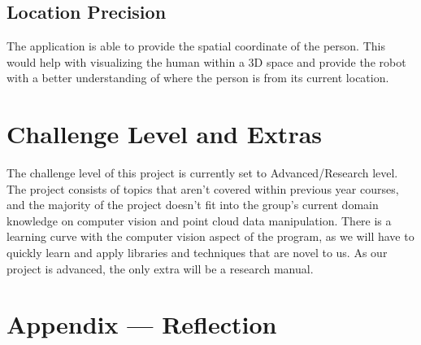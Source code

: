 \documentclass{article}
\begin{document}
\subsection{Location Precision}
The application is able to provide the spatial coordinate of the person. This would help with visualizing the human within a 3D space and provide the robot with a better understanding of where the person is from its current location.

\section{Challenge Level and Extras}

The challenge level of this project is currently set to Advanced/Research level. The project consists of topics 
that aren't covered within previous year courses, and the majority of the project doesn't fit into the group's current domain knowledge on computer vision and point cloud data manipulation. 
There is a learning curve with the computer vision aspect of the program, as we will have to quickly learn and apply libraries and techniques that are novel to us. As our project is advanced, the only extra will be a research manual.


\newpage{}

\section*{Appendix --- Reflection}

   
\end{document}
